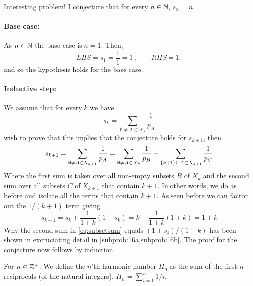 \documentclass[a4paper, english, 12pt]{article} %
\newcommand{\solutions}{true} %
\begin{document}
\begin{answer}
  \noindent
  Interesting problem! I conjecture that for every $n \in \mathbb{N}$, $s_n = n$.
  \paragraph{Base case:} As $n \in \mathbb{N}$ the base case is $n = 1$. Then,
  \begin{equation*}
    LHS = s_1 = \frac{1}{1} = 1 \,, \qquad
    RHS = 1,
  \end{equation*}
  and so the hypothesis holds for the base case.
  
  \paragraph{Inductive step:} We assume that for every $k$ we have
  \begin{equation*}
    s_k = \sum_{\emptyset \neq A \subset X_k} \frac{1}{p_A} 
  \end{equation*}
  wish to prove that this implies that the conjecture holds for $s_{k+1}$, then
  \begin{equation}
    \label{eq:subsetsum}
    s_{k+1}
      = \sum_{\emptyset \neq A \subset X_{k+1}} \frac{1}{p_A}
      = \sum_{\emptyset \neq A \subset X_{k}} \frac{1}{p_B}
      + \sum_{\{k+1\} \subseteq A \subset X_{k+1}} \frac{1}{p_C}\\ 
  \end{equation}
  Where the first sum is taken over all non-empty subsets $B$ of $X_k$ and the
  second sum over all subsets $C$ of $X_{k+1}$ that contain $k+1$. In other
  words, we do as before and isolate all the terms that contain $k+1$. As seen
  before we can factor out the $1/(k+1)$ term giving
  \begin{equation*}
    s_{k+1}
    = s_k + \frac{1}{1+k} (1 + s_k) = k + \frac{1}{1+k}(1+k) = 1 + k
  \end{equation*}
  Why the second sum in \cref{eq:subsetsum} equals $(1+s_k)/(1+k)$ has been shown in excruciating
  detail in
  \cref{subprob:16a,subprob:16b}. The proof for the conjecture now follows by induction.
\end{answer}


\begin{problem}
  For $n \in \mathbb{Z}^+$. We define the $n$'th harmonic number $H_n$ as the sum
  of the first $n$ reciprocals (of the natural integers),  $H_n = \sum_{i=1}^n 1/i$.
\end{problem}
\end{document}

